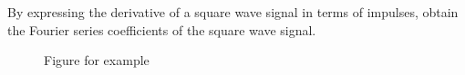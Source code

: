 \begin{frame}
{
}
\end{frame}


\begin{frame}
    \begin{example}
        By expressing the derivative of a square wave signal in terms of impulses, obtain the Fourier series coefficients of the square wave signal.
        \begin{figure}
          \centering
          
          \caption{Figure for example}\label{fi:example3p8_square}
        \end{figure}
    \end{example}
\end{frame}

\begin{frame}
{
}
\end{frame}
